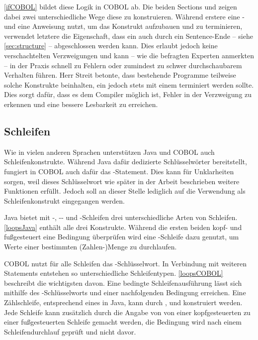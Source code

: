 \autoref{ifCOBOL} bildet diese Logik in COBOL ab. Die beiden Sections  und  zeigen dabei zwei unterschiedliche Wege diese zu konstruieren. Während erstere eine - und eine  Anweisung nutzt, um das Konstrukt aufzubauen und zu terminieren, verwendet letztere die Eigenschaft, dass ein  auch durch ein Sentence-Ende -- siehe \autoref{sec:structure} -- abgeschlossen werden kann. Dies erlaubt jedoch keine verschachtelten Verzweigungen und kann -- wie die befragten Experten anmerkten -- in der Praxis schnell zu Fehlern oder zumindest zu schwer durchschaubarem Verhalten führen. Herr Streit betonte, dass bestehende Programme teilweise solche Konstrukte beinhalten, ein  jedoch stets mit einem  terminiert werden sollte. Dies sorgt dafür, dass es dem Compiler möglich ist, Fehler in der Verzweigung zu erkennen und eine bessere Lesbarkeit zu erreichen.

\subsection{Schleifen}

Wie in vielen anderen Sprachen unterstützen Java und COBOL auch Schleifenkonstrukte. Während Java dafür dedizierte Schlüsselwörter bereitstellt, fungiert in COBOL auch dafür das -Statement. Dies kann für Unklarheiten sorgen, weil dieses Schlüsselwort wie später in der Arbeit beschrieben weitere Funktionen erfüllt. Jedoch soll an dieser Stelle lediglich auf die Verwendung als Schleifenkonstrukt eingegangen werden.

Java bietet mit -, -- und -Schleifen drei unterschiedliche Arten von Schleifen. \autoref{loopsJava} enthält alle drei Konstrukte. Während die ersten beiden kopf- und fußgesteuert eine Bedingung überprüfen wird eine -Schleife \idR dazu genutzt, um Werte einer bestimmten (Zahlen-)Menge zu durchlaufen.


COBOL nutzt für alle Schleifen das -Schlüsselwort. In Verbindung mit weiteren Statements entstehen so unterschiedliche Schleifentypen. \autoref{loopsCOBOL} beschreibt die wichtigsten davon. Eine bedingte Schleifenausführung lässt sich mithilfe des -Schlüsselworts und einer nachfolgenden Bedingung erreichen. Eine Zählschleife, entsprechend eines  in Java, kann durch ,  und  konstruiert werden. Jede Schleife kann zusätzlich durch die Angabe von  von einer kopfgesteuerten zu einer fußgesteuerten Schleife gemacht werden, \dahe die Bedingung wird nach einem Schleifendurchlauf geprüft und nicht davor.

